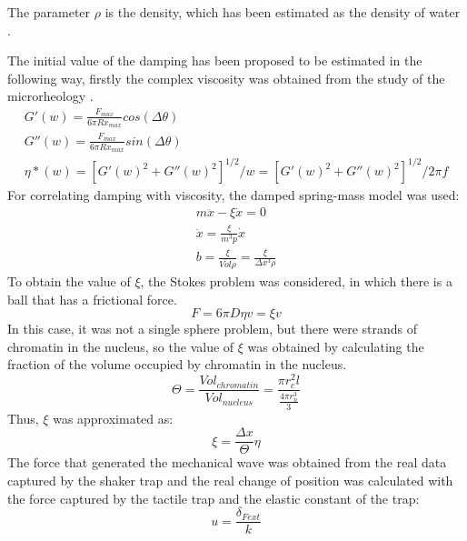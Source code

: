 \documentclass[12pt, a4paper]{article} %
\begin{document}
	The parameter $\rho$ is the density, which has been estimated as the density of water \cite{patterson1994measurement}. 
	
	The initial value of the damping has been proposed to be estimated in the following way, firstly the complex viscosity was obtained from the study of the microrheology \cite{el2008measuring, robertson2018optical}. 
	\begin{equation} \label{eqn:microreology}
		\begin{array}{ l }
			
			G'(w) = \frac{F_{max}}{6\pi R x_{max}} cos(\Delta \theta) \\
			G''(w) = \frac{F_{max}}{6\pi R x_{max}} sin(\Delta \theta) \\
			\eta *(w) = [G'(w)^{2}+G''(w)^{2}]^{1/2}/w = [G'(w)^{2}+G''(w)^{2}]^{1/2}/2\pi f
			
		\end{array}
	\end{equation}
	For correlating damping with viscosity, the damped spring-mass model was used:
	\begin{equation} \label{eqn:modelo_masa_resorte}
		\begin{array}{ l }
			
			m\ddot{x} - \xi \dot{x} = 0 \\
			\ddot{x} = \frac{\xi}{m^{3}p}\dot{x} \\
			b = \frac{\xi}{\bar{Vol} \rho} = \frac{\xi}{\Delta x^{3} \rho}
			
		\end{array}
	\end{equation}
	To obtain the value of $\xi$, the Stokes problem was considered, in which there is a ball that has a frictional force.
	\begin{equation} \label{eqn:stokes}
		F = 6\pi D \eta v = \xi v
	\end{equation}
	In this case, it was not a single sphere problem, but there were strands of chromatin in the nucleus, so the value of $\xi$ was obtained by calculating the fraction of the volume occupied by chromatin in the nucleus.
	\begin{equation} \label{eqn:frac_nucl_chro}
		\Theta = \frac{Vol_{chromatin}}{Vol_{nucleus}} = \frac{\pi r_{c}^{2} l}{\frac{4\pi r_{n}^{3}}{3}}
	\end{equation}
	Thus, $\xi$ was approximated as:
	\begin{equation} \label{eqn:xi_approx}
		\xi = \frac{\Delta x}{\Theta} \eta
	\end{equation}
	The force that generated the mechanical wave was obtained from the real data captured by the shaker trap and the real change of position was calculated with the force captured by the tactile trap and the elastic constant of the trap:
	\begin{equation} \label{eqn:real_desp}
		u = \frac{\delta_{Fext}}{k}
	\end{equation}
	\newpage
	\setlength{\parskip}{0mm}
	
\end{document}
